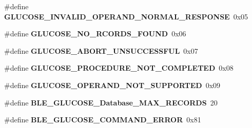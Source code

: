 \begin{DoxyCompactItemize}
\item 
\#define {\bfseries G\+L\+U\+C\+O\+S\+E\+\_\+\+I\+N\+V\+A\+L\+I\+D\+\_\+\+O\+P\+E\+R\+A\+N\+D\+\_\+\+N\+O\+R\+M\+A\+L\+\_\+\+R\+E\+S\+P\+O\+N\+SE}~0x05\hypertarget{group___b_l_e___g_s_ga2d76c31e9e8d49ccd3bdbdb1063caa3c}{}\label{group___b_l_e___g_s_ga2d76c31e9e8d49ccd3bdbdb1063caa3c}

\item 
\#define {\bfseries G\+L\+U\+C\+O\+S\+E\+\_\+\+N\+O\+\_\+\+R\+C\+O\+R\+D\+S\+\_\+\+F\+O\+U\+ND}~0x06\hypertarget{group___b_l_e___g_s_gaab40458cb354c45e1a58991df63ef4d2}{}\label{group___b_l_e___g_s_gaab40458cb354c45e1a58991df63ef4d2}

\item 
\#define {\bfseries G\+L\+U\+C\+O\+S\+E\+\_\+\+A\+B\+O\+R\+T\+\_\+\+U\+N\+S\+U\+C\+C\+E\+S\+S\+F\+UL}~0x07\hypertarget{group___b_l_e___g_s_gaf41662264872004ec1f41e70681daff2}{}\label{group___b_l_e___g_s_gaf41662264872004ec1f41e70681daff2}

\item 
\#define {\bfseries G\+L\+U\+C\+O\+S\+E\+\_\+\+P\+R\+O\+C\+E\+D\+U\+R\+E\+\_\+\+N\+O\+T\+\_\+\+C\+O\+M\+P\+L\+E\+T\+ED}~0x08\hypertarget{group___b_l_e___g_s_ga15d98a58bd51213c5c682e31cf91761c}{}\label{group___b_l_e___g_s_ga15d98a58bd51213c5c682e31cf91761c}

\item 
\#define {\bfseries G\+L\+U\+C\+O\+S\+E\+\_\+\+O\+P\+E\+R\+A\+N\+D\+\_\+\+N\+O\+T\+\_\+\+S\+U\+P\+P\+O\+R\+T\+ED}~0x09\hypertarget{group___b_l_e___g_s_ga287e1c154e26662c7bda9b2a54d8b0ef}{}\label{group___b_l_e___g_s_ga287e1c154e26662c7bda9b2a54d8b0ef}

\item 
\#define {\bfseries B\+L\+E\+\_\+\+G\+L\+U\+C\+O\+S\+E\+\_\+\+Database\+\_\+\+M\+A\+X\+\_\+\+R\+E\+C\+O\+R\+DS}~20\hypertarget{group___b_l_e___g_s_ga72eb5f60d652cb0452d1fd9509a8a302}{}\label{group___b_l_e___g_s_ga72eb5f60d652cb0452d1fd9509a8a302}

\item 
\#define {\bfseries B\+L\+E\+\_\+\+G\+L\+U\+C\+O\+S\+E\+\_\+\+C\+O\+M\+M\+A\+N\+D\+\_\+\+E\+R\+R\+OR}~0x81\hypertarget{group___b_l_e___g_s_gaa1e0c12652d5f35846e4fe387e18456c}{}\label{group___b_l_e___g_s_gaa1e0c12652d5f35846e4fe387e18456c}

\end{DoxyCompactItemize}
